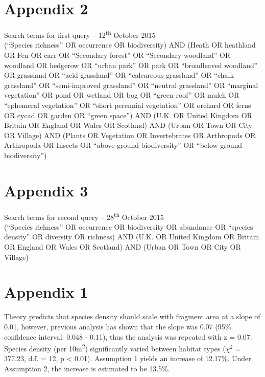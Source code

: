 
\ifappendixStyle %
\else
\section*{Appendix 2}
\fi
Search terms for first query -- 12\textsuperscript{th} October 2015
\\ \newline
(``Species richness'' OR occurrence OR biodiversity) AND (Heath OR heathland OR Fen OR carr OR ``Secondary forest'' OR ``Secondary woodland'' OR woodland OR hedgerow OR ``urban park'' OR park OR ``broadleaved woodland'' OR grassland OR ``acid grassland'' OR ``calcareous grassland'' OR ``chalk grassland'' OR ``semi-improved grassland'' OR ``neutral grassland'' OR ``marginal vegetation'' OR pond OR wetland OR bog OR ``green roof'' OR mulch OR ``ephemeral vegetation'' OR ``short perennial vegetation'' OR orchard OR ferns OR cycad OR garden OR ``green space'') AND (U.K. OR United Kingdom OR Britain OR England OR Wales OR Scotland) AND (Urban OR Town OR City OR Village) AND (Plants OR Vegetation OR Invertebrates OR Arthropods OR Arthropoda OR Insects OR ``above-ground biodiversity'' OR ``below-ground biodiversity'')

\ifappendixStyle %
\else
\section*{Appendix 3}
\fi
Search terms for second query -- 28\textsuperscript{th} October 2015
\\ \newline
(``Species richness'' OR occurrence OR biodiversity OR abundance OR ``species density'' OR diversity OR richness) AND (U.K. OR United Kingdom OR Britain OR England OR Wales OR Scotland) AND (Urban OR Town OR City OR Village)

\ifappendixStyle %
\else
\section*{Appendix 1}
\fi

Theory predicts that species density should scale with fragment area at a slope of 0.01, however, previous analysis has shown that the slope was 0.07 (95\% confidence interval: 0.048 - 0.11), thus the analysis was repeated with z = 0.07.  Species density (per 10m\textsuperscript{2}) significantly varied between habitat types ($\chi^2$ = 377.23, d.f. = 12, p < 0.01).  Assumption 1 yields an increase of 12.17\%. Under Assumption 2, the increase is estimated to be 13.5\%.